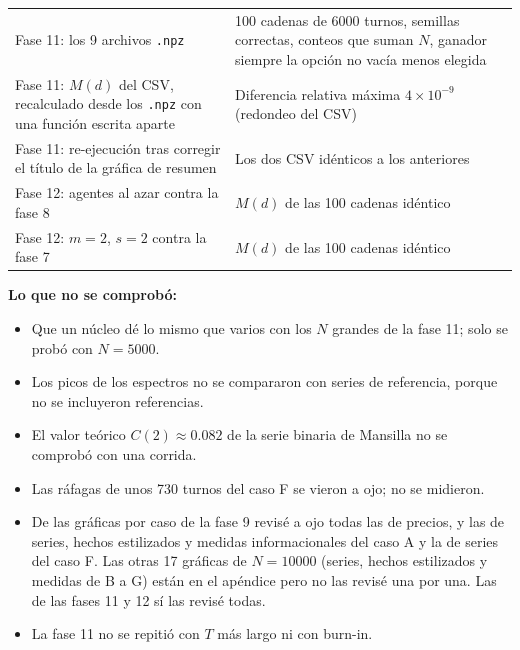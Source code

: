 \documentclass[11pt,letterpaper]{article}
\begin{document}
\begin{longtable}{p{7.6cm}p{7.6cm}}
Fase 11: los 9 archivos \texttt{.npz} & 100 cadenas de 6000 turnos, semillas correctas, conteos que suman $N$, ganador siempre la opción no vacía menos elegida\\
Fase 11: $M(d)$ del CSV, recalculado desde los \texttt{.npz} con una función escrita aparte & Diferencia relativa máxima $4\times10^{-9}$ (redondeo del CSV)\\
Fase 11: re-ejecución tras corregir el título de la gráfica de resumen & Los dos CSV idénticos a los anteriores\\
Fase 12: agentes al azar contra la fase 8 & $M(d)$ de las 100 cadenas idéntico\\
Fase 12: $m=2$, $s=2$ contra la fase 7 & $M(d)$ de las 100 cadenas idéntico\\
\end{longtable}

\textbf{Lo que no se comprobó:}
\begin{itemize}
\item Que un núcleo dé lo mismo que varios con los $N$ grandes de la fase 11; solo se probó con $N=5000$.
\item Los picos de los espectros no se compararon con series de referencia, porque no se incluyeron referencias.
\item El valor teórico $C(2)\approx 0.082$ de la serie binaria de Mansilla no se comprobó con una corrida.
\item Las ráfagas de unos 730 turnos del caso F se vieron a ojo; no se midieron.
\item De las gráficas por caso de la fase 9 revisé a ojo todas las de precios, y las de series, hechos estilizados y medidas informacionales del caso A y la de series del caso F. Las otras 17 gráficas de $N=10000$ (series, hechos estilizados y medidas de B a G) están en el apéndice pero no las revisé una por una. Las de las fases 11 y 12 sí las revisé todas.
\item La fase 11 no se repitió con $T$ más largo ni con burn-in.
\end{itemize}
\end{document}
